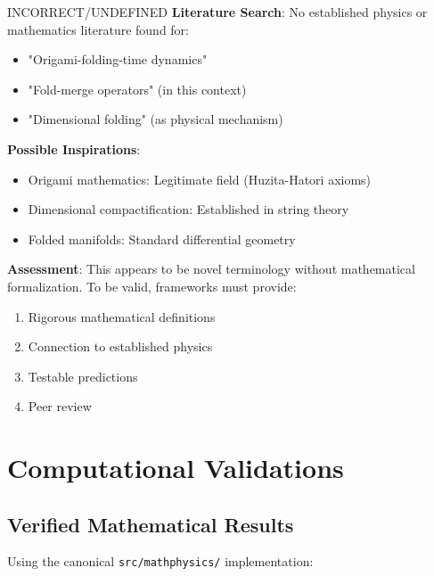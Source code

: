 \begin{factcheck}{INCORRECT/UNDEFINED}
\textbf{Literature Search}: No established physics or mathematics literature found for:
\begin{itemize}
    \item "Origami-folding-time dynamics"
    \item "Fold-merge operators" (in this context)
    \item "Dimensional folding" (as physical mechanism)
\end{itemize}

\textbf{Possible Inspirations}:
\begin{itemize}
    \item Origami mathematics: Legitimate field (Huzita-Hatori axioms)
    \item Dimensional compactification: Established in string theory
    \item Folded manifolds: Standard differential geometry
\end{itemize}

\textbf{Assessment}: This appears to be \textcolor{claimcolor}{novel terminology without mathematical formalization}. To be valid, frameworks must provide:
\begin{enumerate}
    \item Rigorous mathematical definitions
    \item Connection to established physics
    \item Testable predictions
    \item Peer review
\end{enumerate}
\end{factcheck}

\section{Computational Validations}

\subsection{Verified Mathematical Results}

Using the canonical \texttt{src/mathphysics/} implementation:

